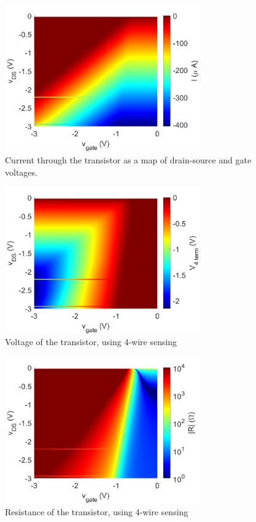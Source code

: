 \documentclass{article}
\begin{document}
\begin{figure} [H]
    \centering
    \includegraphics[width = 0.75\textwidth]{210208resistance_005_2021.02.10.17.23.31_final_i.png}
    \caption{Current through the transistor as a map of drain-source and gate voltages.}
    \label{fig:4wirecurrent}
\end{figure}
\begin{figure}[H]
    \centering
    \includegraphics[width = 0.75\textwidth]{210208resistance_005_2021.02.10.17.23.31_final_v.png}
    \caption{Voltage of the transistor, using 4-wire sensing}
    \label{fig:4wirevoltage}
\end{figure}
\begin{figure}[H]
    \centering
    \includegraphics[width = 0.75\textwidth]{210208resistance_005_2021.02.10.17.23.31_final_res.png}
    \caption{Resistance of the transistor, using 4-wire sensing}
    \label{fig:4wireresistance}
\end{figure}
\end{document}
